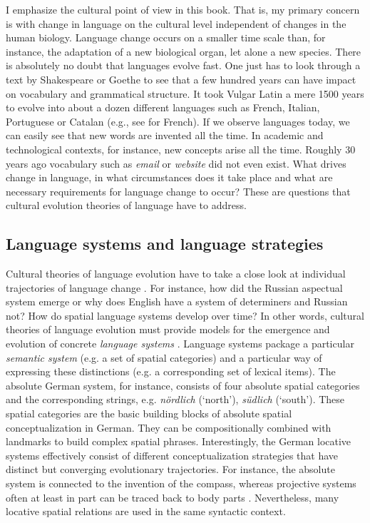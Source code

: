 I emphasize the cultural point of view in this book. That is, my primary concern is
with change in language on the cultural level independent of changes in the human 
biology. Language change occurs on a smaller time scale than, for instance, the 
adaptation of a new biological organ, let alone a new species. There is absolutely no 
doubt that languages evolve fast. One just has to look through a text by 
Shakespeare or Goethe to see that a few hundred years can have impact
on vocabulary and grammatical structure. It took Vulgar Latin a mere 1500 years to 
evolve into about a dozen different languages such as French, Italian, 
Portuguese or Catalan (e.g., see \citealp{pope1952latin} for French). 
If we observe languages today, we can easily see 
that new words are invented all the time.
In academic and technological contexts, for instance, new concepts arise all the time.
Roughly 30 years ago vocabulary such as \textit{email} or \textit{website} did not even exist.
What drives change in language, in what circumstances does it take place and 
what are necessary requirements for language change to occur? These are questions 
that cultural evolution theories of language have to address.

\subsection{Language systems and language strategies}
Cultural theories of language evolution have to take a close look at individual 
trajectories of language change \citep{steels2011self-organization}. For instance, 
how did the Russian aspectual system emerge or why does English have a
system of determiners and Russian not? How do spatial language systems 
develop over time? In other words, cultural theories of language
evolution must provide models for the emergence and evolution of concrete
\emph{language systems} \citep{steels2011self-organization}. 
Language systems package a particular 
\emph{semantic system} (e.g. a set of spatial categories) and a 
particular way of expressing these distinctions (e.g. a corresponding set of 
lexical items). The absolute German system, for instance, consists of 
four absolute spatial categories and the corresponding strings, e.g. 
\textit{n\"ordlich} (`north'), \textit{s\"udlich} (`south'). These spatial
categories are the basic building blocks of absolute spatial conceptualization 
in German. They can be compositionally combined with landmarks to
build complex spatial phrases. Interestingly, the 
German locative systems effectively consist of different conceptualization
strategies that have distinct but converging evolutionary trajectories. For instance,
the absolute system is connected to the invention of the compass,
whereas projective systems often at least in part can be traced back to 
body parts \citep{traugott1991grammaticalization}.
Nevertheless, many locative spatial relations are used in the same syntactic 
context.

